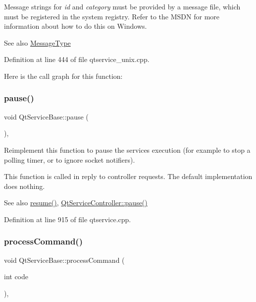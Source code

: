 Message strings for {\itshape id} and {\itshape category} must be provided by a message file, which must be registered in the system registry. Refer to the M\+S\+DN for more information about how to do this on Windows.

\begin{DoxySeeAlso}{See also}
\mbox{\hyperlink{class_qt_service_base_acffd9389fe7178bf1f35d8bf3dae1095}{Message\+Type}} 
\end{DoxySeeAlso}


Definition at line 444 of file qtservice\+\_\+unix.\+cpp.

Here is the call graph for this function\+:
\mbox{\label{class_qt_service_base_a43215a7c5c047d30bcf4f697e6691f89}} 
\subsubsection{\texorpdfstring{pause()}{pause()}}
{\footnotesize\ttfamily void Qt\+Service\+Base\+::pause (\begin{DoxyParamCaption}{ }\end{DoxyParamCaption})\hspace{0.3cm}{\ttfamily [protected]}, {\ttfamily [virtual]}}

Reimplement this function to pause the service\textquotesingle{}s execution (for example to stop a polling timer, or to ignore socket notifiers).

This function is called in reply to controller requests. The default implementation does nothing.

\begin{DoxySeeAlso}{See also}
\mbox{\hyperlink{class_qt_service_base_aaa2e05ef1c36283b6b35348c3972b489}{resume()}}, \mbox{\hyperlink{class_qt_service_controller_aeee2fcc9469f77c7ed8a7955c4fa3a07}{Qt\+Service\+Controller\+::pause()}} 
\end{DoxySeeAlso}


Definition at line 915 of file qtservice.\+cpp.

\mbox{\label{class_qt_service_base_a47485f00f6eba0758d2ffc75092295cf}} 
\subsubsection{\texorpdfstring{process\+Command()}{processCommand()}}
{\footnotesize\ttfamily void Qt\+Service\+Base\+::process\+Command (\begin{DoxyParamCaption}\item[{int}]{code }\end{DoxyParamCaption})\hspace{0.3cm}{\ttfamily [protected]}, {\ttfamily [virtual]}}

